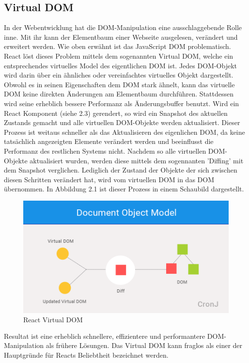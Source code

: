 \subsection{Virtual DOM}
In der Webentwicklung hat die DOM-Manipulation eine ausschlaggebende Rolle inne. Mit ihr kann der Elementbaum einer Webseite ausgelesen, verändert und erweitert werden. Wie oben erwähnt ist das JavaScript DOM problematisch.\\ 
React löst dieses Problem mittels dem sogenannten Virtual DOM, welche ein entsprechendes virtuelles Model des eigentlichen DOM ist. Jedes DOM-Objekt wird darin über ein ähnliches oder vereinfachtes virtuelles Objekt dargestellt. Obwohl es in seinen Eigenschaften dem DOM stark ähnelt, kann das virtuelle DOM keine direkten Änderungen am Elementbaum durchführen. Stattdessen wird seine erheblich bessere Performanz als Änderungsbuffer benutzt. Wird ein React Komponent (siehe 2.3) gerendert, so wird ein Snapshot des aktuellen Zustands gemacht und alle virtuellen DOM-Objekte werden aktualisiert. Dieser Prozess ist weitaus schneller als das Aktualisieren des eigenlichen DOM, da keine tatsächlich angezeigten Elemente verändert werden und beeinflusst die Performanz des restlichen Systems nicht. Nachdem so alle virtuellen DOM-Objekte aktualisiert wurden, werden diese mittels dem sogennanten 'Diffing' mit dem Snapshot verglichen. Lediglich der Zustand der Objekte der sich zwischen diesen Schritten verändert hat, wird vom virtuellen DOM in das DOM übernommen. In Abbildung 2.1 ist dieser Prozess in einem Schaubild dargestellt.\\
\begin{figure}[H]
     \centerline{\includegraphics[width=14cm]{../Abbildungen/virtualDom.png}}
  \caption{React Virtual DOM}
  \label{React Virtual DOM}
\end{figure}
Resultat ist eine erheblich schnellere, effizientere und performantere DOM-Manipulation als frühere Lösungen. Das Virtual DOM kann fraglos als einer der Hauptgründe für Reacts Beliebtheit bezeichnet werden.
